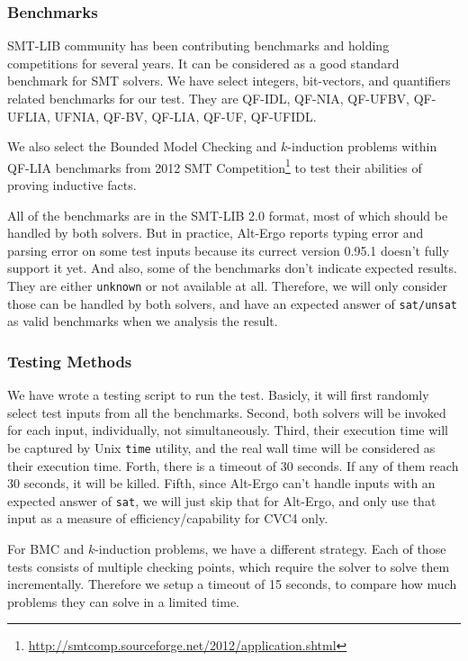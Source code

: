 \documentclass[10pt,letter]{article}
\theoremstyle{definition}
\begin{document}
\subsubsection{Benchmarks}

SMT-LIB community has been contributing benchmarks and holding competitions for several years\cite{bs2010}. It can be considered as a good standard benchmark for SMT solvers. We have select integers, bit-vectors, and quantifiers related benchmarks for our test. They are QF-IDL, QF-NIA, QF-UFBV, QF-UFLIA, UFNIA, QF-BV, QF-LIA, QF-UF, QF-UFIDL.

We also select the Bounded Model Checking and $k$-induction problems within QF-LIA benchmarks from 2012 SMT Competition\footnote{\url{http://smtcomp.sourceforge.net/2012/application.shtml}}\cite{cok20122012}
to test their abilities of proving inductive facts.

All of the benchmarks are in the SMT-LIB 2.0 format, most of which should be handled by both solvers. But in practice, Alt-Ergo reports typing error and parsing error on some test inputs because its currect version 0.95.1 doesn't fully support it yet. And also, some of the benchmarks don't indicate expected results. They are either {\tt unknown} or not available at all. Therefore, we will only consider those can be handled by both solvers, and have an expected answer of {\tt sat/unsat} as valid benchmarks when we analysis the result.

\subsubsection{Testing Methods}

We have wrote a testing script to run the test. Basicly, it will first randomly select test inputs from all the benchmarks. Second, both solvers will be invoked for each input, individually, not simultaneously. Third, their execution time will be captured by Unix {\tt time} utility, and the real wall time will be considered as their execution time. Forth, there is a timeout of 30 seconds. If any of them reach 30 seconds, it will be killed. Fifth, since Alt-Ergo can't handle inputs with an expected answer of {\tt sat}, we will just skip that for Alt-Ergo, and only use that input as a measure of efficiency/capability for CVC4 only.

For BMC and $k$-induction problems, we have a different strategy. Each of those tests consists of multiple checking points, which require the solver to solve them incrementally. Therefore we setup a timeout of 15 seconds, to compare how much problems they can solve in a limited time.
\end{document}
